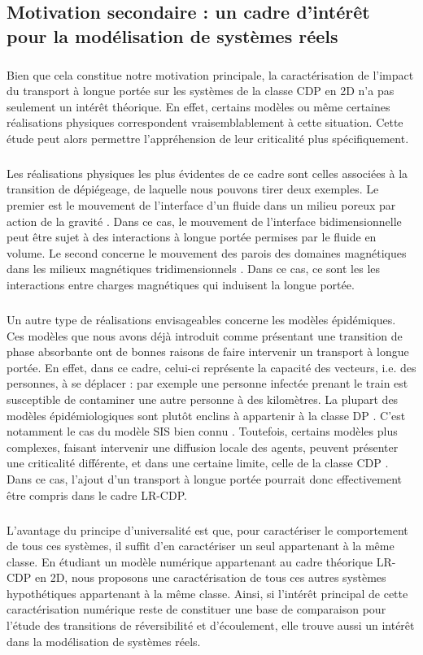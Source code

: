 \subsection{Motivation secondaire : un cadre d'intérêt pour la modélisation de systèmes réels}

\subparagraph{}Bien que cela constitue notre motivation principale, la caractérisation de l'impact du transport à longue portée sur les systèmes de la classe CDP en 2D n'a pas seulement un intérêt théorique. En effet, certains modèles ou même certaines réalisations physiques correspondent vraisemblablement à cette situation. Cette étude peut alors permettre l'appréhension de leur criticalité plus spécifiquement.

\subparagraph{}Les réalisations physiques les plus évidentes de ce cadre sont celles associées à la transition de dépiégeage, de laquelle nous pouvons tirer deux exemples. Le premier est le mouvement de l'interface d'un fluide dans un milieu poreux par action de la gravité \cite{zhao_interface_2013}. Dans ce cas, le mouvement de l'interface bidimensionnelle peut être sujet à des interactions à longue portée permises par le fluide en volume. Le second concerne le mouvement des parois des domaines magnétiques dans les milieux magnétiques tridimensionnels \cite{alava_disorder_induced_1996}. Dans ce cas, ce sont les les interactions entre charges magnétiques qui induisent la longue portée.

\subparagraph{}Un autre type de réalisations envisageables concerne les modèles épidémiques. Ces modèles que nous avons déjà introduit comme présentant une transition de phase absorbante ont de bonnes raisons de faire intervenir un transport à longue portée. En effet, dans ce cadre, celui-ci représente la capacité des vecteurs, i.e. des personnes, à se déplacer : par exemple une personne infectée prenant le train est susceptible de contaminer une autre personne à des kilomètres. La plupart des modèles épidémiologiques sont plutôt enclins à appartenir à la classe DP \cite{sanhedrai_epidemics_2022}. C'est notamment le cas du modèle SIS bien connu \cite{mota_critical_2018}. Toutefois, certains modèles plus complexes, faisant intervenir une diffusion locale des agents, peuvent présenter une criticalité différente, et dans une certaine limite, celle de la classe CDP \cite{nettuno_role_2024}. Dans ce cas, l'ajout d'un transport à longue portée pourrait donc effectivement être compris dans le cadre LR-CDP.

\subparagraph{}L'avantage du principe d'universalité est que, pour caractériser le comportement de tous ces systèmes, il suffit d'en caractériser un seul appartenant à la même classe. En étudiant un modèle numérique appartenant au cadre théorique LR-CDP en 2D, nous proposons une caractérisation de tous ces autres systèmes hypothétiques appartenant à la même classe. Ainsi, si l'intérêt principal de cette caractérisation numérique reste de constituer une base de comparaison pour l'étude des transitions de réversibilité et d'écoulement, elle trouve aussi un intérêt dans la modélisation de systèmes réels.

